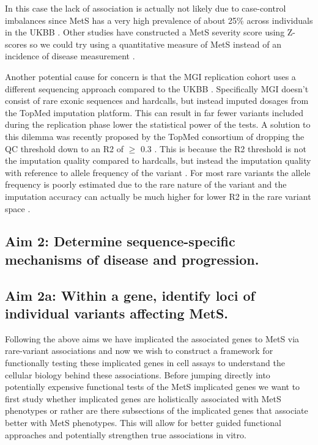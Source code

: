 \documentclass[11pt]{article}
\begin{document}
In this case the lack of association is actually not likely due to case-control imbalances since MetS has a very high prevalence of about 25\% across individuals in the UKBB \cite{pmid31589552}. Other studies have constructed a MetS severity score using Z-scores so we could try using a quantitative measure of MetS instead of an incidence of disease measurement \cite{Low2019}. 

Another potential cause for concern is that the MGI replication cohort uses a different sequencing approach compared to the UKBB \cite{Zawistowski2023}. Specifically MGI doesn't consist of rare exonic sequences and hardcalls, but instead imputed dosages from the TopMed imputation platform. This can result in far fewer variants included during the replication phase lower the statistical power of the tests. A solution to this dilemma was recently proposed by the TopMed consortium of dropping the QC threshold down to an R2 of $\ge$ 0.3 \cite{Taliun2021}. This is because the R2 threshold is not the imputation quality compared to hardcalls, but instead the imputation quality with reference to allele frequency of the variant \cite{Taliun2021}. For most rare variants the allele frequency is poorly estimated due to the rare nature of the variant and the imputation accuracy can actually be much higher for lower R2 in the rare variant space \cite{Taliun2021}.

\subsection*{Aim 2: Determine sequence-specific mechanisms of disease and progression.}

\subsection*{Aim 2a: Within a gene, identify loci of individual variants affecting MetS.} 

\noindent {}

Following the above aims we have implicated the associated genes to MetS via rare-variant associations and now we wish to construct a framework for functionally testing these implicated genes in cell assays to understand the cellular biology behind these associations. Before jumping directly into potentially expensive functional tests of the MetS implicated genes we want to first study whether implicated genes are holistically associated with MetS phenotypes or rather are there subsections of the implicated genes that associate better with MetS phenotypes. This will allow for better guided functional approaches and potentially strengthen true associations in vitro.
\end{document}
